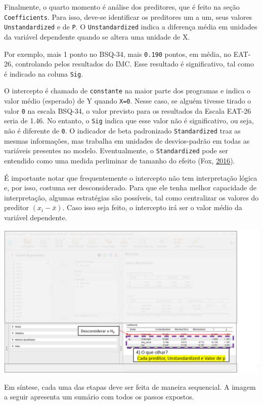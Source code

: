 \documentclass[
]{book}
\begin{document}
Finalmente, o quarto momento é análise dos preditores, que é feito na
seção \texttt{Coefficients}. Para isso, deve-se identificar os
preditores um a um, seus valores \texttt{Unstandardized} e de
\texttt{P}. O \texttt{Unstandardized} indica a diferença média em
unidades da variável dependente quando se altera uma unidade de X.

Por exemplo, mais 1 ponto no BSQ-34, mais \texttt{0.190} pontos, em
média, no EAT-26, controlando pelos resultados do IMC. Esse resultado é
significativo, tal como é indicado na coluna \texttt{Sig}.

O intercepto é chamado de \texttt{constante} na maior parte dos
programas e indica o valor médio (esperado) de Y quando \texttt{X=0}.
Nesse caso, se alguém tivesse tirado o valor \texttt{0} na escala
BSQ-34, o valor previsto para os resultados da Escala EAT-26 seria de
1.46. No entanto, o \texttt{Sig} indica que esse valor não é
significativo, ou seja, não é diferente de \texttt{0}. O indicador de
beta padronizado \texttt{Standardized} traz as mesmas informações, mas
trabalha em unidades de desvios-padrão em todas as variáveis presentes
no modelo. Eventualmente, o \texttt{Standardized} pode ser entendido
como uma medida perliminar de tamanho do efeito (Fox,
\protect\hyperlink{ref-fox2016}{2016}).

É importante notar que frequentemente o intercepto não tem interpretação
lógica e, por isso, costuma ser desconsiderado. Para que ele tenha
melhor capacidade de interpretação, algumas estratégias são possíveis,
tal como centralizar os valores do preditor \((x_i-\bar{x})\). Caso isso
seja feito, o intercepto irá ser o valor médio da variável dependente.

\includegraphics{./img/cap_reg_multipla_resultado_4.png}

Em síntese, cada uma das etapas deve ser feita de maneira sequencial. A
imagem a seguir apresenta um sumário com todos os passos expostos.
\end{document}
